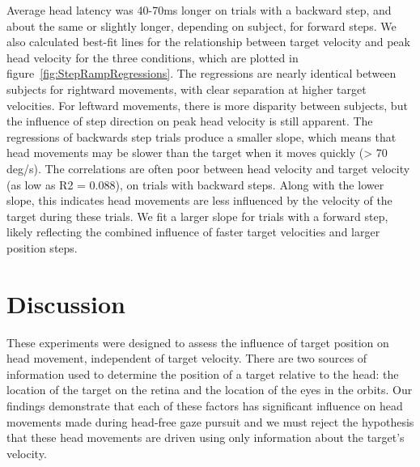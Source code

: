 \documentclass[12pt]{article}
\begin{document}
Average head latency was 40-70ms longer on trials with a backward step, and about the same or slightly longer, depending on subject, for forward steps. We also calculated best-fit lines for the relationship between target velocity and peak head velocity for the three conditions, which are plotted in figure~\ref{fig:StepRampRegressions}. The regressions are nearly identical between subjects for rightward movements, with clear separation at higher target velocities. For leftward movements, there is more disparity between subjects, but the influence of step direction on peak head velocity is still apparent. The regressions of backwards step trials produce a smaller slope, which means that head movements may be slower than the target when it moves quickly (> 70 deg/s). The correlations are often poor between head velocity and target velocity (as low as R2 = 0.088), on trials with backward steps. Along with the lower slope, this indicates head movements are less influenced by the velocity of the target during these trials. We fit a larger slope for trials with a forward step, likely reflecting the combined influence of faster target velocities and larger position steps.
\clearpage


\section{Discussion}
These experiments were designed to assess the influence of target position on head movement, independent of target velocity. There are two sources of information used to determine the position of a target relative to the head: the location of the target on the retina and the location of the eyes in the orbits. Our findings demonstrate that each of these factors has significant influence on head movements made during head-free gaze pursuit and we must reject the hypothesis that these head movements are driven using only information about the target’s velocity. 
\end{document}
